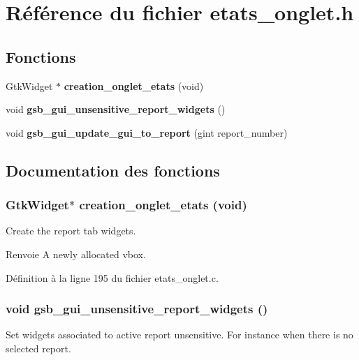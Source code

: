 \section{Référence du fichier etats\_\-onglet.h}
\label{etats__onglet_8h}
\subsection*{Fonctions}
\begin{DoxyCompactItemize}
\item 
GtkWidget $\ast$ {\bf creation\_\-onglet\_\-etats} (void)
\item 
void {\bf gsb\_\-gui\_\-unsensitive\_\-report\_\-widgets} ()
\item 
void {\bf gsb\_\-gui\_\-update\_\-gui\_\-to\_\-report} (gint report\_\-number)
\end{DoxyCompactItemize}


\subsection{Documentation des fonctions}
\subsubsection[{creation\_\-onglet\_\-etats}]{\setlength{\rightskip}{0pt plus 5cm}GtkWidget$\ast$ creation\_\-onglet\_\-etats (void)}\label{etats__onglet_8h_a285336f1df04e46f0e34f9c5f5264508}
Create the report tab widgets.

\begin{DoxyReturn}{Renvoie}
A newly allocated vbox. 
\end{DoxyReturn}


Définition à la ligne 195 du fichier etats\_\-onglet.c.

\subsubsection[{gsb\_\-gui\_\-unsensitive\_\-report\_\-widgets}]{\setlength{\rightskip}{0pt plus 5cm}void gsb\_\-gui\_\-unsensitive\_\-report\_\-widgets ()}\label{etats__onglet_8h_abb6e5627c18a42073725cc404ec23162}
Set widgets associated to active report unsensitive. For instance when there is no selected report. 

